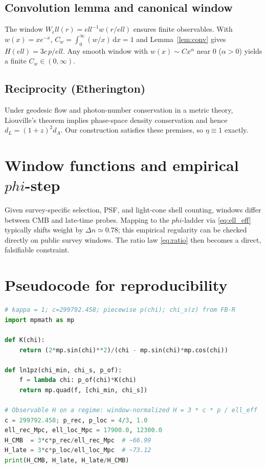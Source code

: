 \documentclass[
  onecolumn,
  amsmath,amssymb,
  aps,
  prd,
  superscriptaddress,
  nofootinbib,
  longbibliography
]{revtex4-2}
\newcommand{\vp}{\varphi}
\def\varphi{phi}%
\def\ell{ell}%
\begin{document}
\subsection{Convolution lemma and canonical window}
The window $W_\ell(r)=\ell^{-1}w(r/\ell)$ ensures finite observables. With $w(x)=x e^{-x}$, $C_w=\int_0^\infty (w/x)\,\mathrm{d}x=1$ and Lemma~\ref{lem:conv} gives $H(\ell)=3c\,p/\ell$. Any smooth window with $w(x)\sim Cx^\alpha$ near $0$ ($\alpha>0$) yields a finite $C_w\in(0,\infty)$.

\subsection{Reciprocity (Etherington)}
Under geodesic flow and photon-number conservation in a metric theory, Liouville's theorem implies phase-space density conservation and hence $d_L=(1+z)^2 d_A$. Our construction satisfies these premises, so $\eta\equiv1$ exactly.

\section{Window functions and empirical $\vp$-step}
Given survey-specific selection, PSF, and light-cone shell counting, windows differ between CMB and late-time probes. Mapping to the $\vp$-ladder via \eqref{eq:ell_eff} typically shifts weight by $\Delta n\simeq 0.78$; this empirical regularity can be checked directly on public survey windows. The ratio law \eqref{eq:ratio} then becomes a direct, falsifiable constraint.

\section{Pseudocode for reproducibility}
\label{app:pseudo}
\begin{lstlisting}[language=Python]
# kappa = 1; c=299792.458; piecewise p(chi); chi_s(z) from FB-R
import mpmath as mp

def K(chi):
    return (2*mp.sin(chi)**2)/(chi - mp.sin(chi)*mp.cos(chi))

def ln1pz(chi_min, chi_s, p_of):
    f = lambda chi: p_of(chi)*K(chi)
    return mp.quad(f, [chi_min, chi_s])

# Observable H on a regime: window-normalized H = 3 * c * p / ell_eff
c = 299792.458; p_rec, p_loc = 4/3, 1.0
ell_rec_Mpc, ell_loc_Mpc = 17900.0, 12300.0
H_CMB  = 3*c*p_rec/ell_rec_Mpc  # ~66.99
H_late = 3*c*p_loc/ell_loc_Mpc  # ~73.12
print(H_CMB, H_late, H_late/H_CMB)
\end{lstlisting}
\end{document}

